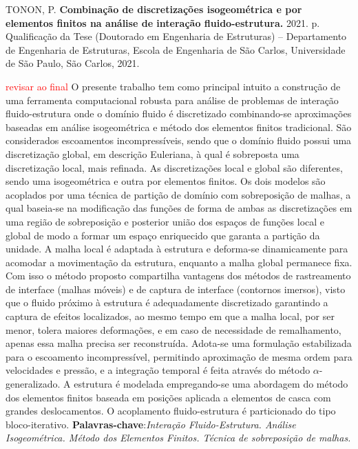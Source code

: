 \documentclass[
	12pt,		
	openright,
	twoside,	
	a4paper,			
	english,	
	french,		
	spanish,		
	brazil				
	]{abntex2}
\begin{document}
\begin{SingleSpace}
\begin{resumo}[Resumo]
	\begin{flushleft}
		TONON, P. \textbf{Combinação de discretizações isogeométrica e por elementos finitos na análise de interação fluido-estrutura.} 2021. \pageref{LastPage} p. Qualifica\c{c}\~ao da Tese (Doutorado em Engenharia de Estruturas) – Departamento de Engenharia de Estruturas, Escola de Engenharia de São Carlos, Universidade de São Paulo, São Carlos, 2021.\newline 
	\end{flushleft}
	\noindent
	\textcolor{red}{revisar ao final}
	O presente trabalho tem como principal intuito a construção de uma ferramenta computacional robusta para análise de problemas de interação fluido-estrutura onde o domínio fluido é discretizado combinando-se aproximações baseadas em análise isogeométrica e método dos elementos finitos tradicional. 
	São considerados escoamentos incompressíveis, sendo que o domínio fluido possui uma discretização global, em descrição Euleriana, à qual é sobreposta uma discretização local, mais refinada. As discretizações local e global são diferentes, sendo uma isogeométrica e outra por elementos finitos. Os dois modelos são acoplados por uma técnica de partição de domínio com sobreposição de malhas, a qual baseia-se na modificação das funções de forma de ambas as discretizações em uma região de sobreposição e posterior união dos espaços de funções local e global de modo a formar um espaço enriquecido que garanta a partição da unidade. A malha local é adaptada à estrutura e deforma-se dinamicamente para acomodar a movimentação da estrutura, enquanto a malha global permanece fixa. Com isso o método proposto compartilha vantagens dos métodos de rastreamento de interface (malhas móveis) e de captura de interface (contornos imersos), visto que o fluido próximo à estrutura é adequadamente discretizado garantindo a captura de efeitos localizados, ao mesmo tempo em que a malha local, por ser menor, tolera maiores deformações, e em caso de necessidade de remalhamento, apenas essa malha precisa ser reconstruída. Adota-se uma formulação estabilizada para o escoamento incompressível, permitindo aproximação de mesma ordem para velocidades e pressão, e a integração temporal é feita através do método $\alpha$-generalizado. A estrutura é modelada empregando-se uma abordagem do método dos elementos finitos baseada em posições aplicada a elementos de casca com grandes deslocamentos. O acoplamento fluido-estrutura é particionado do tipo bloco-iterativo. 
	\newline \newline
  	\textbf{Palavras-chave}:\textit{Interação Fluido-Estrutura.  Análise Isogeométrica. Método dos Elementos Finitos. Técnica de sobreposição de malhas.}  \cleardoublepage
\end{resumo}
\end{SingleSpace}
\end{document}
